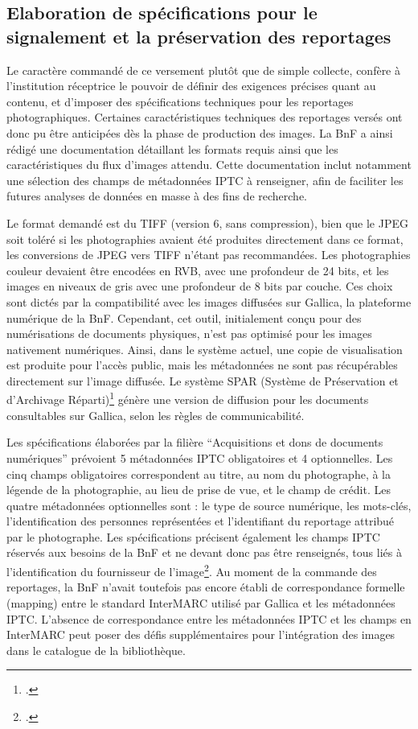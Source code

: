 \subsection*{Elaboration de spécifications pour le signalement et la préservation des reportages}

Le caractère commandé de ce versement plutôt que de simple collecte, confère à l'institution réceptrice le pouvoir de définir des exigences précises quant au contenu, et d'imposer des spécifications techniques pour les reportages photographiques. Certaines caractéristiques techniques des reportages versés ont donc pu être anticipées dès la phase de production des images. La BnF a ainsi rédigé une documentation détaillant les formats requis ainsi que les caractéristiques du flux d’images attendu. Cette documentation inclut notamment une sélection des champs de métadonnées IPTC à renseigner, afin de faciliter les futures analyses de données en masse à des fins de recherche. 

Le format demandé est du TIFF (version 6, sans compression), bien que le JPEG soit toléré si les photographies avaient été produites directement dans ce format, les conversions de JPEG vers TIFF n'étant pas recommandées. Les photographies couleur devaient être encodées en RVB, avec une profondeur de 24 bits, et les images en niveaux de gris avec une profondeur de 8 bits par couche. Ces choix sont dictés par la compatibilité avec les images diffusées sur Gallica, la plateforme numérique de la BnF. Cependant, cet outil, initialement conçu pour des numérisations de documents physiques, n'est pas optimisé pour les images nativement numériques. Ainsi, dans le système actuel, une copie de visualisation est produite pour l'accès public, mais les métadonnées ne sont pas récupérables directement sur l’image diffusée. Le système SPAR (Système de Préservation et d'Archivage Réparti)\footcite{sparBNF} génère une version de diffusion pour les documents consultables sur Gallica, selon les règles de communicabilité.

Les spécifications élaborées par la filière \enquote{Acquisitions et dons de documents numériques} prévoient 5 métadonnées IPTC obligatoires et 4 optionnelles. Les cinq champs obligatoires correspondent au titre, au nom du photographe, à la légende de la photographie, au lieu de prise de vue, et le champ de crédit. Les quatre métadonnées optionnelles sont : le type de source numérique, les mots-clés, l'identification des personnes représentées et l'identifiant du reportage attribué par le photographe. Les spécifications précisent également les champs IPTC réservés aux besoins de la BnF et ne devant donc pas être renseignés, tous liés à l'identification du fournisseur de l'image\footcite{speacqbnf}. Au moment de la commande des reportages, la BnF n’avait toutefois pas encore établi de correspondance formelle (mapping) entre le standard \gls{InterMARC} utilisé par Gallica et les métadonnées IPTC. L'absence de correspondance entre les métadonnées IPTC et les champs en InterMARC peut poser des défis supplémentaires pour l’intégration des images dans le catalogue de la bibliothèque.

